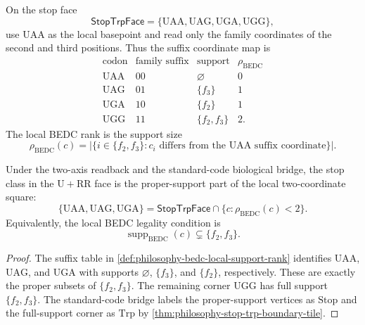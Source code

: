 \begin{definition}
\label{def:philosophy-bedc-local-support-rank}
On the stop face
$$
  \mathsf{StopTrpFace}
  =
  \{\mathrm{UAA},\mathrm{UAG},\mathrm{UGA},\mathrm{UGG}\},
$$
use $\mathrm{UAA}$ as the local basepoint and read only the family
coordinates of the second and third positions. Thus the suffix coordinate
map is
$$
\begin{array}{c|c|c|r}
  \text{codon} & \text{family suffix} & \text{support} &
  \rho_{\mathrm{BEDC}}\\
  \hline
  \mathrm{UAA} & 00 & \varnothing & 0\\
  \mathrm{UAG} & 01 & \{f_{3}\} & 1\\
  \mathrm{UGA} & 10 & \{f_{2}\} & 1\\
  \mathrm{UGG} & 11 & \{f_{2},f_{3}\} & 2.
\end{array}
$$
The local BEDC rank is the support size
$$
  \rho_{\mathrm{BEDC}}(c)
  =
  |\{i\in\{f_{2},f_{3}\}:c_{i}\text{ differs from the }\mathrm{UAA}
  \text{ suffix coordinate}\}|.
$$
\end{definition}

\begin{theorem}
\label{thm:philosophy-bedc-stop-rank-deficiency}
Under the two-axis readback and the standard-code biological bridge, the
stop class in the $\mathrm{U}+\mathrm{RR}$ face is the proper-support part
of the local two-coordinate square:
$$
  \{\mathrm{UAA},\mathrm{UAG},\mathrm{UGA}\}
  =
  \mathsf{StopTrpFace}\cap
  \{c:\rho_{\mathrm{BEDC}}(c)<2\}.
$$
Equivalently, the local BEDC legality condition is
$$
  \operatorname{supp}_{\mathrm{BEDC}}(c)\subsetneq\{f_{2},f_{3}\}.
$$
\end{theorem}
\begin{proof}
The suffix table in
\autoref{def:philosophy-bedc-local-support-rank} identifies
$\mathrm{UAA}$, $\mathrm{UAG}$, and $\mathrm{UGA}$ with supports
$\varnothing$, $\{f_{3}\}$, and $\{f_{2}\}$, respectively. These are
exactly the proper subsets of $\{f_{2},f_{3}\}$. The remaining corner
$\mathrm{UGG}$ has full support $\{f_{2},f_{3}\}$. The standard-code bridge
labels the proper-support vertices as $\mathrm{Stop}$ and the full-support
corner as $\mathrm{Trp}$ by
\autoref{thm:philosophy-stop-trp-boundary-tile}.
\end{proof}

